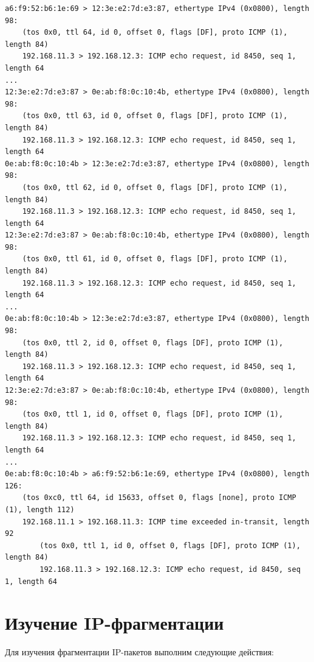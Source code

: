 \documentclass[a4paper,12pt]{article}
\begin{document}
\begin{Verbatim}
a6:f9:52:b6:1e:69 > 12:3e:e2:7d:e3:87, ethertype IPv4 (0x0800), length 98:
    (tos 0x0, ttl 64, id 0, offset 0, flags [DF], proto ICMP (1), length 84) 
    192.168.11.3 > 192.168.12.3: ICMP echo request, id 8450, seq 1, length 64
...
12:3e:e2:7d:e3:87 > 0e:ab:f8:0c:10:4b, ethertype IPv4 (0x0800), length 98:
    (tos 0x0, ttl 63, id 0, offset 0, flags [DF], proto ICMP (1), length 84)
    192.168.11.3 > 192.168.12.3: ICMP echo request, id 8450, seq 1, length 64
0e:ab:f8:0c:10:4b > 12:3e:e2:7d:e3:87, ethertype IPv4 (0x0800), length 98:
    (tos 0x0, ttl 62, id 0, offset 0, flags [DF], proto ICMP (1), length 84)
    192.168.11.3 > 192.168.12.3: ICMP echo request, id 8450, seq 1, length 64
12:3e:e2:7d:e3:87 > 0e:ab:f8:0c:10:4b, ethertype IPv4 (0x0800), length 98:
    (tos 0x0, ttl 61, id 0, offset 0, flags [DF], proto ICMP (1), length 84)
    192.168.11.3 > 192.168.12.3: ICMP echo request, id 8450, seq 1, length 64
...
0e:ab:f8:0c:10:4b > 12:3e:e2:7d:e3:87, ethertype IPv4 (0x0800), length 98:
    (tos 0x0, ttl 2, id 0, offset 0, flags [DF], proto ICMP (1), length 84)
    192.168.11.3 > 192.168.12.3: ICMP echo request, id 8450, seq 1, length 64
12:3e:e2:7d:e3:87 > 0e:ab:f8:0c:10:4b, ethertype IPv4 (0x0800), length 98:
    (tos 0x0, ttl 1, id 0, offset 0, flags [DF], proto ICMP (1), length 84)
    192.168.11.3 > 192.168.12.3: ICMP echo request, id 8450, seq 1, length 64
...
0e:ab:f8:0c:10:4b > a6:f9:52:b6:1e:69, ethertype IPv4 (0x0800), length 126:
    (tos 0xc0, ttl 64, id 15633, offset 0, flags [none], proto ICMP (1), length 112)
    192.168.11.1 > 192.168.11.3: ICMP time exceeded in-transit, length 92
	    (tos 0x0, ttl 1, id 0, offset 0, flags [DF], proto ICMP (1), length 84)
	    192.168.11.3 > 192.168.12.3: ICMP echo request, id 8450, seq 1, length 64
\end{Verbatim}

\section{Изучение IP-фрагментации}

Для изучения фрагментации IP-пакетов выполним следующие действия:
\end{document}
